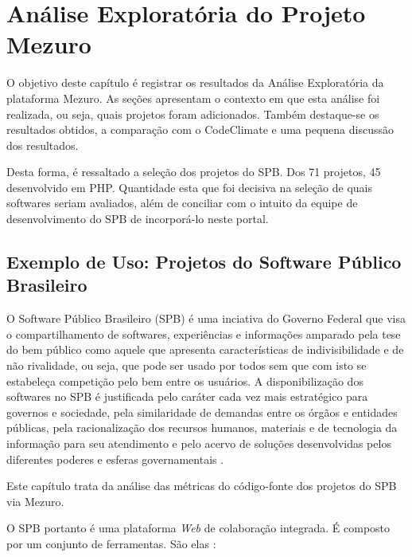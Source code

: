 \chapter{Análise Exploratória do Projeto Mezuro}

O objetivo deste capítulo é registrar os resultados da Análise Exploratória da
plataforma Mezuro. As seções apresentam o contexto em que esta análise foi
realizada, ou seja, quais projetos foram adicionados. Também destaque-se os
resultados obtidos, a comparação com o CodeClimate e uma pequena discussão dos
resultados.

Desta forma, é ressaltado a seleção dos projetos do SPB. Dos 71 projetos, 45%
desenvolvido em PHP. Quantidade esta que foi decisiva na seleção de quais
softwares seriam avaliados, além de conciliar com o intuito da equipe de
desenvolvimento do SPB de incorporá-lo neste portal.

\section{Exemplo de Uso: Projetos do Software Público Brasileiro}

O Software Público Brasileiro (SPB) é uma inciativa do Governo Federal que visa
o compartilhamento de softwares, experiências e informações amparado pela tese
do bem público como aquele que apresenta características de indivisibilidade e
de não rivalidade, ou seja, que pode ser usado por todos sem que com isto se
estabeleça competição pelo bem entre os usuários. A disponibilização dos
softwares no SPB é justificada pelo caráter cada vez mais estratégico para
governos e sociedade, pela similaridade de demandas entre os órgãos e entidades
públicas, pela racionalização dos recursos humanos, materiais e de tecnologia
da informação para seu atendimento e pelo acervo de soluções desenvolvidas
pelos diferentes poderes e esferas governamentais \cite{santos2011in01}.

Este capítulo trata da análise das métricas do código-fonte dos projetos do SPB
via Mezuro.

O SPB portanto é uma plataforma \textit{Web} de colaboração integrada. É composto por um
conjunto de ferramentas. São elas \cite{aboutSPB}:

